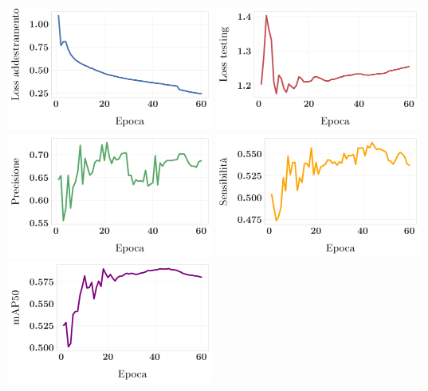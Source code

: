 \documentclass[12pt]{report}
\begin{document}
\begin{figure}[h!]
	\centering
	{\includegraphics[width=0.48\textwidth]{images/domain-shift/sim-to-sim/2/train-loss}}
	\hspace{0.01\textwidth}
	{\includegraphics[width=0.48\textwidth]{images/domain-shift/sim-to-sim/2/testing-loss}}
	\hspace{0.01\textwidth}
	\\	
	{\includegraphics[width=0.48\textwidth]{images/domain-shift/sim-to-sim/2/precision}}
	\hspace{0.01\textwidth}
	{\includegraphics[width=0.48\textwidth]{images/domain-shift/sim-to-sim/2/recall}}
	\hspace{0.01\textwidth}
	\\
	{\includegraphics[width=0.48\textwidth]{images/domain-shift/sim-to-sim/2/map50}}

\end{figure}
\end{document}
